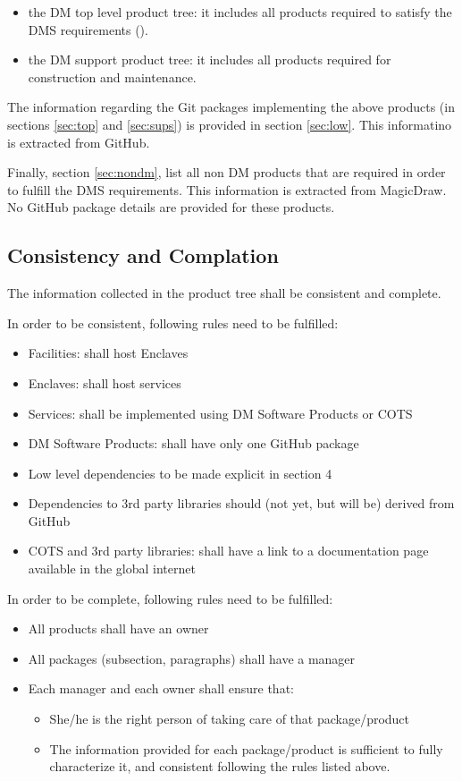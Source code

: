 \begin{itemize}
\item the DM top level product tree: it includes all products required to satisfy the DMS requirements ().
\item the DM support product tree: it includes all products required for construction and maintenance.
\end{itemize}

The information regarding the Git packages implementing the above products (in sections \ref{sec:top} and \ref{sec:sups}) is provided in section \ref{sec:low}. 
This informatino is extracted from GitHub.

Finally, section \ref{sec:nondm}, list all non DM products that are required in order to fulfill the DMS requirements.
This information is extracted from MagicDraw.
No GitHub package details are provided for these products. 


\subsection{Consistency and Complation}\label{sec:cons-comp}

The information collected in the product tree shall be consistent and complete.

In order to be consistent, following rules need to be fulfilled:

\begin{itemize}
\item Facilities: shall host Enclaves
\item Enclaves: shall host services
\item Services: shall be implemented using DM Software Products or COTS
\item DM Software Products: shall have only one GitHub package
\item Low level dependencies to be made explicit in section 4
\item Dependencies to 3rd party libraries should (not yet, but will be) derived from GitHub
\item COTS and 3rd party libraries: shall have a link to a documentation page available in the global internet
\end{itemize}

In order to be complete, following rules need to be fulfilled:

\begin{itemize}
\item All products shall have an owner
\item All packages (subsection, paragraphs) shall have a manager
\item Each manager and each owner shall ensure that:
\begin{itemize}
\item She/he is the right person of taking care of that package/product
\item The information provided for each package/product is sufficient to fully characterize it, and consistent following the rules listed above.
\end{itemize}
\end{itemize}


